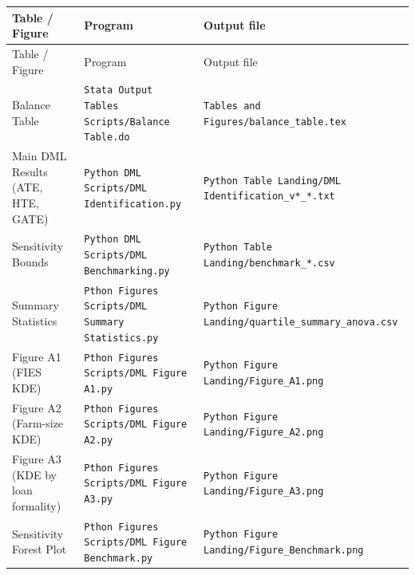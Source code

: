 \documentclass[11pt]{article}
\begin{document}
\begin{longtable}{@{}p{}p{}p{}@{}}
\toprule
Table / Figure & Program & Output file \\
\midrule
\endfirsthead
\toprule
Table / Figure & Program & Output file \\
\midrule
\endhead
\bottomrule
\endfoot
Balance Table &
    \texttt{Stata Output Tables Scripts/\newline Balance Table.do} &
    \texttt{Tables and Figures/\newline balance\_table.tex} \\[3pt]
Main DML Results (ATE, HTE, GATE) &
    \texttt{Python DML Scripts/\newline DML Identification.py} &
    \texttt{Python Table Landing/\newline DML Identification\_v*\_*.txt} \\[3pt]
Sensitivity Bounds &
    \texttt{Python DML Scripts/\newline DML Benchmarking.py} &
    \texttt{Python Table Landing/\newline benchmark\_*.csv} \\[3pt]
Summary Statistics &
    \texttt{Pthon Figures Scripts/\newline DML Summary Statistics.py} &
    \texttt{Python Figure Landing/\newline quartile\_summary\_anova.csv} \\[3pt]
Figure A1 (FIES KDE) &
    \texttt{Pthon Figures Scripts/\newline DML Figure A1.py} &
    \texttt{Python Figure Landing/\newline Figure\_A1.png} \\[3pt]
Figure A2 (Farm-size KDE) &
    \texttt{Pthon Figures Scripts/\newline DML Figure A2.py} &
    \texttt{Python Figure Landing/\newline Figure\_A2.png} \\[3pt]
Figure A3 (KDE by loan formality) &
    \texttt{Pthon Figures Scripts/\newline DML Figure A3.py} &
    \texttt{Python Figure Landing/\newline Figure\_A3.png} \\[3pt]
Sensitivity Forest Plot &
    \texttt{Pthon Figures Scripts/\newline DML Figure Benchmark.py} &
    \texttt{Python Figure Landing/\newline Figure\_Benchmark.png} \\
\end{longtable}
\end{document}
